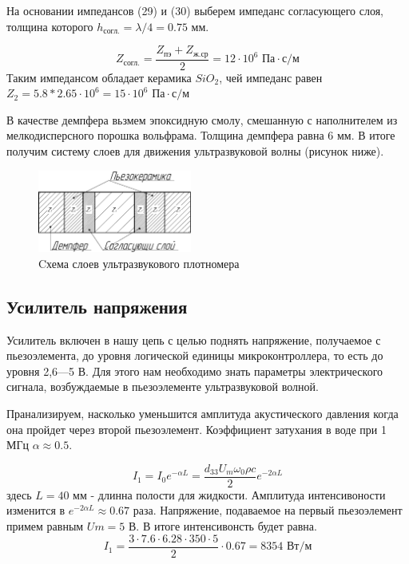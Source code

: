 \documentclass[russian, utf8, 12pt]{eskdtext}
\begin{document}
На основании импедансов (29) и (30) выберем импеданс согласующего слоя, толщина которого $h_\text{согл.} = \lambda/4 = 0.75$ мм.

\begin{equation}
	Z_\text{согл.} = \frac{Z_\text{пэ} + Z_\text{ж.ср}}{2} = 12 \cdot 10^6 \text{ Па}\cdot\text{с/м}
\end{equation}
Таким импедансом обладает керамика $SiO_2$, чей импеданс равен $Z_{2} = 5.8 * 2.65 \cdot 10^6 = 15 \cdot 10^6 \text{ Па}\cdot\text{с/м}$

В качестве демпфера вьзмем эпоксидную смолу, смешанную с наполнителем из мелкодисперсного порошка вольфрама. Толщина демпфера равна $6$ мм. В итоге получим систему слоев для движения ультразвуковой волны (рисунок ниже).
\begin{figure}[h!]
	\centering
	\includegraphics[width = 0.45\textwidth] {DensityMeterScheme.pdf}
	\caption{Cхема слоев ультразвукового плотномера}
\end{figure}

\newpage
\subsection{Усилитель напряжения}
Усилитель включен в нашу цепь с целью поднять напряжение, получаемое с пьезоэлемента, до уровня логической единицы микроконтроллера, то есть до уровня 2,6—5 В. Для этого нам необходимо знать параметры электрического сигнала, возбуждаемые в пьезоэлементе ультразвуковой волной. \par
Пранализируем, насколько уменьшится амплитуда акустического давления когда она пройдет через второй пьезоэлемент. Коэффициент затухания в воде при 1 МГц $\alpha \approx 0.5$.

\begin{equation}
	I_1 = I_0 e^{-\alpha L} = \frac{d_{33} U_m \omega_0 \rho c}{2} e^{-2\alpha L}
\end{equation}
здесь $L = 40$ мм - длинна полости для жидкости. Амплитуда интенсивоности изменится в $e^{-2\alpha L} \approx 0.67$ раза. Напряжение, подаваемое на первый пьезоэлемент примем равным $Um = 5$ В.  В итоге интенсивонсть будет равна.
\begin{equation}
	I_1 = \frac{3 \cdot 7.6 \cdot 6.28 \cdot 350 \cdot 5}{2} \cdot 0.67 = 8354 \text{ Вт/м}
\end{equation}
\end{document}

